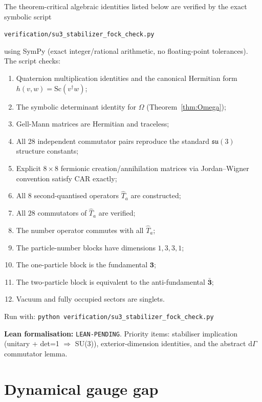 \documentclass[12pt,a4paper]{article}
\theoremstyle{definition}
\theoremstyle{remark}
\begin{document}
The theorem-critical algebraic identities listed below are verified by the exact symbolic script
\begin{center}
  \texttt{verification/su3\_stabilizer\_fock\_check.py}
\end{center}
using SymPy (exact integer/rational arithmetic, no floating-point tolerances).
The script checks:
\begin{enumerate}
  \item Quaternion multiplication identities and the canonical Hermitian form
        $h(v,w)=\mathrm{Sc}(v^\dagger w)$;
  \item The symbolic determinant identity for $\Omega$ (Theorem~\ref{thm:Omega});
  \item Gell-Mann matrices are Hermitian and traceless;
  \item All 28 independent commutator pairs reproduce the standard $\mathfrak{su}(3)$ structure constants;
  \item Explicit $8\times 8$ fermionic creation/annihilation matrices via
        Jordan--Wigner convention satisfy CAR exactly;
  \item All $8$ second-quantised operators $\hat{T}_a$ are constructed;
  \item All $28$ commutators of $\hat{T}_a$ are verified;
  \item The number operator commutes with all $\hat{T}_a$;
  \item The particle-number blocks have dimensions $1,3,3,1$;
  \item The one-particle block is the fundamental $\mathbf{3}$;
  \item The two-particle block is equivalent to the anti-fundamental $\bar{\mathbf{3}}$;
  \item Vacuum and fully occupied sectors are singlets.
\end{enumerate}
Run with: \texttt{python verification/su3\_stabilizer\_fock\_check.py}

\medskip
\textbf{Lean formalisation:} \texttt{LEAN-PENDING}.
Priority items: stabiliser implication (unitary + det=1 $\Rightarrow$ SU(3)),
exterior-dimension identities, and the abstract $\mathrm{d}\Gamma$ commutator lemma.

\section{Dynamical gauge gap}
\label{sec:dyn_gap}
\end{document}
